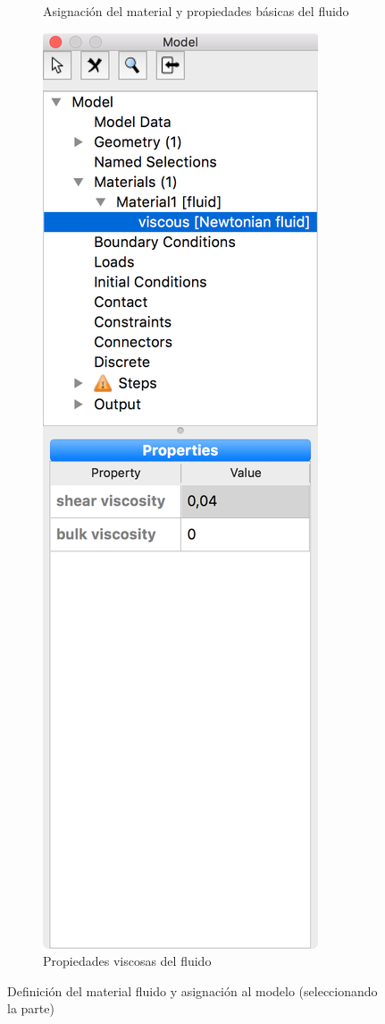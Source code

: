 \begin{figure}[!htp]
\begin{subfigure}[b]{0.50\textwidth}
\caption{Asignación del material y propiedades básicas del fluido}
\label{fig:pre-02-b}
\end{subfigure}
\begin{subfigure}[b]{0.19\textwidth}
\includegraphics[width=\linewidth]{figuras_4/02_pre_mat-fluid-3.png}
\caption{Propiedades viscosas del fluido}
\label{fig:pre-02-c}
\end{subfigure}
\caption{Definición del material fluido y asignación al modelo (seleccionando la parte)}
\label{fig:pre-02}
\end{figure}

